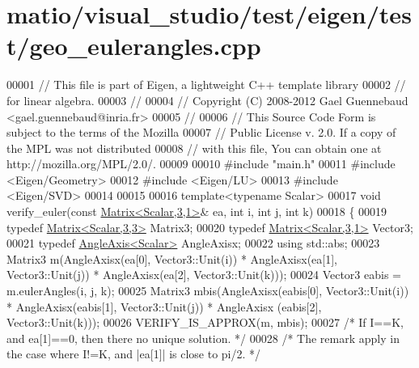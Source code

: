 \hypertarget{matio_2visual__studio_2test_2eigen_2test_2geo__eulerangles_8cpp_source}{}\section{matio/visual\+\_\+studio/test/eigen/test/geo\+\_\+eulerangles.cpp}
\label{matio_2visual__studio_2test_2eigen_2test_2geo__eulerangles_8cpp_source}

\begin{DoxyCode}
00001 \textcolor{comment}{// This file is part of Eigen, a lightweight C++ template library}
00002 \textcolor{comment}{// for linear algebra.}
00003 \textcolor{comment}{//}
00004 \textcolor{comment}{// Copyright (C) 2008-2012 Gael Guennebaud <gael.guennebaud@inria.fr>}
00005 \textcolor{comment}{//}
00006 \textcolor{comment}{// This Source Code Form is subject to the terms of the Mozilla}
00007 \textcolor{comment}{// Public License v. 2.0. If a copy of the MPL was not distributed}
00008 \textcolor{comment}{// with this file, You can obtain one at http://mozilla.org/MPL/2.0/.}
00009 
00010 \textcolor{preprocessor}{#include "main.h"}
00011 \textcolor{preprocessor}{#include <Eigen/Geometry>}
00012 \textcolor{preprocessor}{#include <Eigen/LU>}
00013 \textcolor{preprocessor}{#include <Eigen/SVD>}
00014 
00015 
00016 \textcolor{keyword}{template}<\textcolor{keyword}{typename} Scalar>
00017 \textcolor{keywordtype}{void} verify\_euler(\textcolor{keyword}{const} \hyperlink{group___core___module}{Matrix<Scalar,3,1>}& ea, \textcolor{keywordtype}{int} i, \textcolor{keywordtype}{int} j, \textcolor{keywordtype}{int} k)
00018 \{
00019   \textcolor{keyword}{typedef} \hyperlink{group___core___module_class_eigen_1_1_matrix}{Matrix<Scalar,3,3>} Matrix3;
00020   \textcolor{keyword}{typedef} \hyperlink{group___core___module}{Matrix<Scalar,3,1>} Vector3;
00021   \textcolor{keyword}{typedef} \hyperlink{group___geometry___module_class_eigen_1_1_angle_axis}{AngleAxis<Scalar>} AngleAxisx;
00022   \textcolor{keyword}{using} std::abs;
00023   Matrix3 m(AngleAxisx(ea[0], Vector3::Unit(i)) * AngleAxisx(ea[1], Vector3::Unit(j)) * AngleAxisx(ea[2], 
      Vector3::Unit(k)));
00024   Vector3 eabis = m.eulerAngles(i, j, k);
00025   Matrix3 mbis(AngleAxisx(eabis[0], Vector3::Unit(i)) * AngleAxisx(eabis[1], Vector3::Unit(j)) * AngleAxisx
      (eabis[2], Vector3::Unit(k))); 
00026   VERIFY\_IS\_APPROX(m,  mbis); 
00027   \textcolor{comment}{/* If I==K, and ea[1]==0, then there no unique solution. */} 
00028   \textcolor{comment}{/* The remark apply in the case where I!=K, and |ea[1]| is close to pi/2. */} 

\end{DoxyCode}
